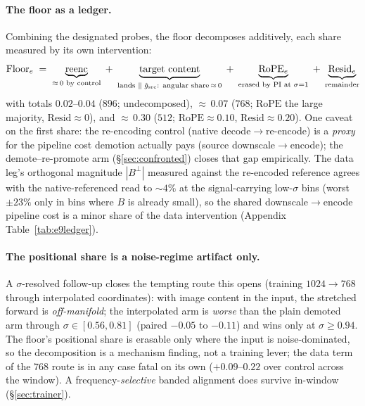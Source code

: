 \paragraph{The floor as a ledger.}
Combining the designated probes, the floor decomposes additively, each
share measured by its own intervention:
\begin{equation*}
\mathrm{Floor}_e \;=\;
\underbrace{\mathrm{reenc}}_{{\approx}\,0 \text{ by control}}
\;+\; \underbrace{\text{target content}}_{\text{lands }\parallel\;
\hat g_{\mathrm{src}}\text{: angular share}\,{\approx}\,0}
\;+\; \underbrace{\mathrm{RoPE}_e}_{\text{erased by PI at }\sigma{=}1}
\;+\; \underbrace{\mathrm{Resid}_e}_{\text{remainder}}
\end{equation*}
with totals $0.02$--$0.04$ ($896$; undecomposed),
${\approx}\,0.07$ ($768$; $\mathrm{RoPE}$ the large majority,
$\mathrm{Resid} \approx 0$), and ${\approx}\,0.30$ ($512$;
$\mathrm{RoPE} \approx 0.10$, $\mathrm{Resid} \approx 0.20$). One
caveat on the first share: the re-encoding control
(native decode$\to$re-encode) is a \emph{proxy} for the pipeline cost
demotion actually pays (source downscale$\to$encode); the
demote--re-promote arm (\S\ref{sec:confronted}) closes that gap
empirically. The data leg's orthogonal magnitude $|B^{\perp}|$
measured against the re-encoded reference agrees with the
native-referenced read to ${\sim}4\%$ at the signal-carrying
low-$\sigma$ bins (worst $\pm 23\%$ only in bins where $B$ is already
small), so the shared downscale$\to$encode pipeline cost is a minor
share of the data intervention (Appendix Table~\ref{tab:e9ledger}).

\paragraph{The positional share is a noise-regime artifact only.}
A $\sigma$-resolved follow-up closes the tempting route this opens
(training $1024{\to}768$ through interpolated coordinates): with image
content in the input, the stretched forward is \emph{off-manifold}; the
interpolated arm is \emph{worse} than the plain demoted arm through
$\sigma \in [0.56, 0.81]$ (paired $-0.05$ to $-0.11$) and wins only at
$\sigma \ge 0.94$. The floor's positional share is erasable only where
the input is noise-dominated, so the decomposition is a mechanism finding,
not a training lever; the data term of the $768$ route is in any case
fatal on its own ($+0.09$--$0.22$ over control across the window). A
frequency-\emph{selective} banded alignment does survive in-window
(\S\ref{sec:trainer}).

